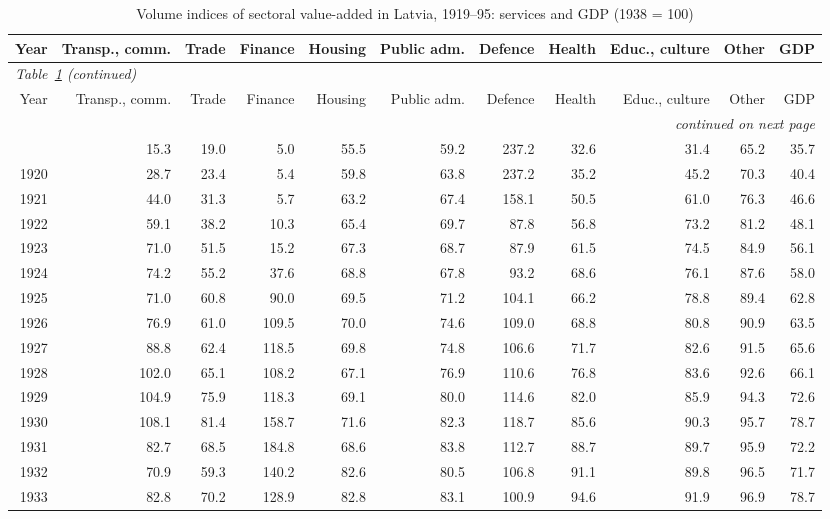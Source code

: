 \setlength{\tabcolsep}{3pt}
\begin{longtable}{r*{10}{r}}
\caption{Volume indices of sectoral value-added in Latvia, 1919--95: services and GDP (1938 = 100)}\label{tab:appsec2}\\
\toprule
Year & Transp., comm. & Trade & Finance & Housing & Public adm. & Defence & Health & Educ., culture & Other & GDP \\
\midrule
\endfirsthead
\multicolumn{11}{l}{\textit{Table~\ref{tab:appsec2} (continued)}} \\ \toprule
Year & Transp., comm. & Trade & Finance & Housing & Public adm. & Defence & Health & Educ., culture & Other & GDP \\
\midrule
\endhead
\midrule \multicolumn{11}{r}{\textit{continued on next page}} \\
\endfoot
\bottomrule
\endlastfoot
1919 & 15.3 & 19.0 & 5.0 & 55.5 & 59.2 & 237.2 & 32.6 & 31.4 & 65.2 & 35.7 \\
1920 & 28.7 & 23.4 & 5.4 & 59.8 & 63.8 & 237.2 & 35.2 & 45.2 & 70.3 & 40.4 \\
1921 & 44.0 & 31.3 & 5.7 & 63.2 & 67.4 & 158.1 & 50.5 & 61.0 & 76.3 & 46.6 \\
1922 & 59.1 & 38.2 & 10.3 & 65.4 & 69.7 & 87.8 & 56.8 & 73.2 & 81.2 & 48.1 \\
1923 & 71.0 & 51.5 & 15.2 & 67.3 & 68.7 & 87.9 & 61.5 & 74.5 & 84.9 & 56.1 \\
1924 & 74.2 & 55.2 & 37.6 & 68.8 & 67.8 & 93.2 & 68.6 & 76.1 & 87.6 & 58.0 \\
1925 & 71.0 & 60.8 & 90.0 & 69.5 & 71.2 & 104.1 & 66.2 & 78.8 & 89.4 & 62.8 \\
1926 & 76.9 & 61.0 & 109.5 & 70.0 & 74.6 & 109.0 & 68.8 & 80.8 & 90.9 & 63.5 \\
1927 & 88.8 & 62.4 & 118.5 & 69.8 & 74.8 & 106.6 & 71.7 & 82.6 & 91.5 & 65.6 \\
1928 & 102.0 & 65.1 & 108.2 & 67.1 & 76.9 & 110.6 & 76.8 & 83.6 & 92.6 & 66.1 \\
1929 & 104.9 & 75.9 & 118.3 & 69.1 & 80.0 & 114.6 & 82.0 & 85.9 & 94.3 & 72.6 \\
1930 & 108.1 & 81.4 & 158.7 & 71.6 & 82.3 & 118.7 & 85.6 & 90.3 & 95.7 & 78.7 \\
1931 & 82.7 & 68.5 & 184.8 & 68.6 & 83.8 & 112.7 & 88.7 & 89.7 & 95.9 & 72.2 \\
1932 & 70.9 & 59.3 & 140.2 & 82.6 & 80.5 & 106.8 & 91.1 & 89.8 & 96.5 & 71.7 \\
1933 & 82.8 & 70.2 & 128.9 & 82.8 & 83.1 & 100.9 & 94.6 & 91.9 & 96.9 & 78.7 \\

\end{longtable}
